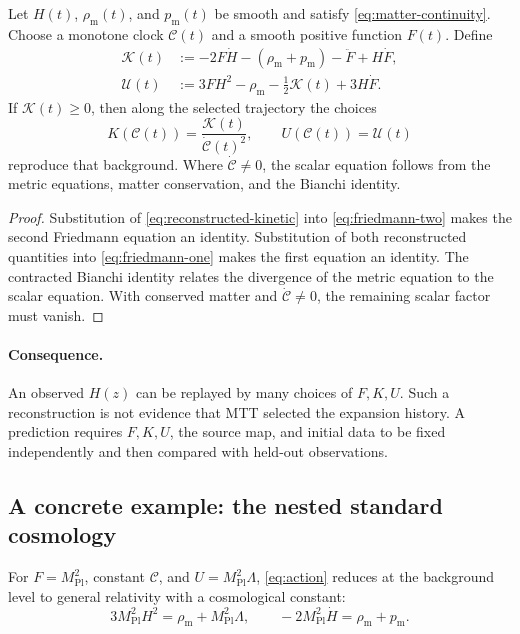 \documentclass[11pt]{article}
\newcommand{\CC}{\mathcal C}
\newcommand{\mpl}{M_{\mathrm{Pl}}}
\begin{document}
\begin{theorem}
\label{thm:reconstruction}
Let $H(t)$, $\rho_{\mathrm m}(t)$, and $p_{\mathrm m}(t)$ be smooth and
satisfy \cref{eq:matter-continuity}.  Choose a monotone clock
$\CC(t)$ and a smooth positive function $F(t)$.  Define
\begin{align}
 \mathcal K(t)
 &:=
 -2F\dot H-(\rho_{\mathrm m}+p_{\mathrm m})
 -\ddot F+H\dot F,
 \label{eq:reconstructed-kinetic}\\
 \mathcal U(t)
 &:=
 3F H^2-\rho_{\mathrm m}
 -\frac{1}{2}\mathcal K(t)+3H\dot F.
 \label{eq:reconstructed-potential}
\end{align}
If $\mathcal K(t)\geq0$, then along the selected trajectory the choices
\[
 K(\CC(t))=\frac{\mathcal K(t)}{\dot{\CC}(t)^2},
 \qquad
 U(\CC(t))=\mathcal U(t)
\]
reproduce that background.  Where $\dot{\CC}\neq0$, the scalar equation
follows from the metric equations, matter conservation, and the Bianchi
identity.
\end{theorem}

\begin{proof}
Substitution of \cref{eq:reconstructed-kinetic} into
\cref{eq:friedmann-two} makes the second Friedmann equation an identity.
Substitution of both reconstructed quantities into
\cref{eq:friedmann-one} makes the first equation an identity.  The
contracted Bianchi identity relates the divergence of the metric
equation to the scalar equation.  With conserved matter and
$\dot{\CC}\neq0$, the remaining scalar factor must vanish.
\end{proof}

\paragraph{Consequence.}
An observed $H(z)$ can be replayed by many choices of $F,K,U$.  Such a
reconstruction is not evidence that MTT selected the expansion history.
A prediction requires $F,K,U$, the source map, and initial data to be
fixed independently and then compared with held-out observations.

\subsection{A concrete example: the nested standard cosmology}

\begin{proposition}
\label{prop:lcdm}
For $F=\mpl^2$, constant $\CC$, and
$U=\mpl^2\Lambda$, \cref{eq:action} reduces at the background level to
general relativity with a cosmological constant:
\[
 3\mpl^2H^2=\rho_{\mathrm m}+\mpl^2\Lambda,
 \qquad
 -2\mpl^2\dot H=\rho_{\mathrm m}+p_{\mathrm m}.
\]
\end{proposition}
\end{document}
